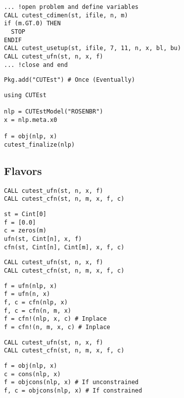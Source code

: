 \begin{frame}[t,fragile]
  \begin{verbatim}
... !open problem and define variables
CALL cutest_cdimen(st, ifile, n, m)
if (m.GT.0) THEN
  STOP
ENDIF
CALL cutest_usetup(st, ifile, 7, 11, n, x, bl, bu)
CALL cutest_ufn(st, n, x, f)
... !close and end
\end{verbatim}
\end{frame}

\begin{frame}[t,fragile]
  \begin{verbatim}
Pkg.add("CUTEst") # Once (Eventually)
\end{verbatim}
\begin{verbatim}
using CUTEst

nlp = CUTEstModel("ROSENBR")
x = nlp.meta.x0

f = obj(nlp, x)
cutest_finalize(nlp)
\end{verbatim}
\end{frame}

\subsection{Flavors}

\begin{frame}[t,fragile]
\begin{verbatim}
CALL cutest_ufn(st, n, x, f)
CALL cutest_cfn(st, n, m, x, f, c)
\end{verbatim}
\begin{verbatim}
st = Cint[0]
f = [0.0]
c = zeros(m)
ufn(st, Cint[n], x, f)
cfn(st, Cint[n], Cint[m], x, f, c)
\end{verbatim}
\end{frame}

\begin{frame}[t,fragile]
\begin{verbatim}
CALL cutest_ufn(st, n, x, f)
CALL cutest_cfn(st, n, m, x, f, c)
\end{verbatim}
\begin{verbatim}
f = ufn(nlp, x)
f = ufn(n, x)
f, c = cfn(nlp, x)
f, c = cfn(n, m, x)
f = cfn!(nlp, x, c) # Inplace
f = cfn!(n, m, x, c) # Inplace
\end{verbatim}
\end{frame}

\begin{frame}[t,fragile]
\begin{verbatim}
CALL cutest_ufn(st, n, x, f)
CALL cutest_cfn(st, n, m, x, f, c)
\end{verbatim}
\begin{verbatim}
f = obj(nlp, x)
c = cons(nlp, x)
f = objcons(nlp, x) # If unconstrained
f, c = objcons(nlp, x) # If constrained
\end{verbatim}
\end{frame}


